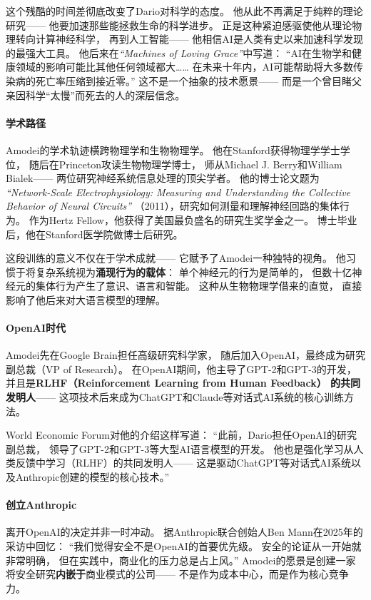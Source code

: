 这个残酷的时间差彻底改变了Dario对科学的态度。
他从此不再满足于纯粹的理论研究——
他要加速那些能拯救生命的科学进步。
正是这种紧迫感驱使他从理论物理转向计算神经科学，
再到人工智能——
他相信AI是人类有史以来加速科学发现的最强大工具。
他后来在\textit{``Machines of Loving Grace''}中写道：
``AI在生物学和健康领域的影响可能比其他任何领域都大……
在未来十年内，AI可能帮助将大多数传染病的死亡率压缩到接近零。''
这不是一个抽象的技术愿景——
而是一个曾目睹父亲因科学``太慢''而死去的人的深层信念。

\paragraph{学术路径}
Amodei的学术轨迹横跨物理学和生物物理学。
他在Stanford获得物理学学士学位，
随后在Princeton攻读生物物理学博士，
师从Michael J. Berry和William Bialek——
两位研究神经系统信息处理的顶尖学者。
他的博士论文题为
\textit{``Network-Scale Electrophysiology:
Measuring and Understanding the Collective Behavior of Neural Circuits''}
（2011），研究如何测量和理解神经回路的集体行为。
作为Hertz Fellow，他获得了美国最负盛名的研究生奖学金之一。
博士毕业后，他在Stanford医学院做博士后研究。

这段训练的意义不仅在于学术成就——
它赋予了Amodei一种独特的视角。
他习惯于将复杂系统视为\textbf{涌现行为的载体}：
单个神经元的行为是简单的，
但数十亿神经元的集体行为产生了意识、语言和智能。
这种从生物物理学借来的直觉，
直接影响了他后来对大语言模型的理解。

\paragraph{OpenAI时代}
Amodei先在Google Brain担任高级研究科学家，
随后加入OpenAI，最终成为研究副总裁（VP of Research）。
在OpenAI期间，他主导了GPT-2和GPT-3的开发，
并且是\textbf{RLHF（Reinforcement Learning from Human Feedback）
的共同发明人}——
这项技术后来成为ChatGPT和Claude等对话式AI系统的核心训练方法。

World Economic Forum对他的介绍这样写道：
``此前，Dario担任OpenAI的研究副总裁，
领导了GPT-2和GPT-3等大型AI语言模型的开发。
他也是强化学习从人类反馈中学习（RLHF）的共同发明人——
这是驱动ChatGPT等对话式AI系统以及Anthropic创建的模型的核心技术。''

\paragraph{创立Anthropic}
离开OpenAI的决定并非一时冲动。
据Anthropic联合创始人Ben Mann在2025年的采访中回忆：
``我们觉得安全不是OpenAI的首要优先级。
安全的论证从一开始就非常明确，
但在实践中，商业化的压力总是占上风。''
Amodei的愿景是创建一家将安全研究\textbf{内嵌于}商业模式的公司——
不是作为成本中心，而是作为核心竞争力。

